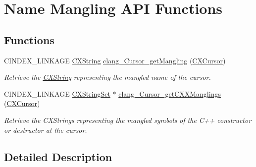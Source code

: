 \hypertarget{group__CINDEX__MANGLE}{}\section{Name Mangling A\+PI Functions}
\label{group__CINDEX__MANGLE}
\subsection*{Functions}
\begin{DoxyCompactItemize}
\item 
\mbox{\label{group__CINDEX__MANGLE_ga5d471df1f0608075193c33753549250a}} 
C\+I\+N\+D\+E\+X\+\_\+\+L\+I\+N\+K\+A\+GE \mbox{\hyperlink{structCXString}{C\+X\+String}} \mbox{\hyperlink{group__CINDEX__MANGLE_ga5d471df1f0608075193c33753549250a}{clang\+\_\+\+Cursor\+\_\+get\+Mangling}} (\mbox{\hyperlink{structCXCursor}{C\+X\+Cursor}})
\begin{DoxyCompactList}\small\item\em Retrieve the \mbox{\hyperlink{structCXString}{C\+X\+String}} representing the mangled name of the cursor. \end{DoxyCompactList}\item 
\mbox{\label{group__CINDEX__MANGLE_ga27a071c8adf5c10b09c6b0b0aba54b79}} 
C\+I\+N\+D\+E\+X\+\_\+\+L\+I\+N\+K\+A\+GE \mbox{\hyperlink{structCXStringSet}{C\+X\+String\+Set}} $\ast$ \mbox{\hyperlink{group__CINDEX__MANGLE_ga27a071c8adf5c10b09c6b0b0aba54b79}{clang\+\_\+\+Cursor\+\_\+get\+C\+X\+X\+Manglings}} (\mbox{\hyperlink{structCXCursor}{C\+X\+Cursor}})
\begin{DoxyCompactList}\small\item\em Retrieve the C\+X\+Strings representing the mangled symbols of the C++ constructor or destructor at the cursor. \end{DoxyCompactList}\end{DoxyCompactItemize}


\subsection{Detailed Description}
